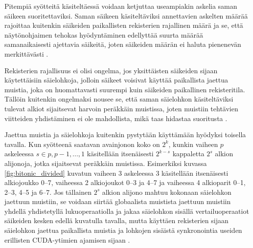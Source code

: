 \documentclass[a4paper,11pt]{article}
\begin{document}
Pitempiä syötteitä käsiteltäessä voidaan ketjuttaa useampiakin askelia saman säikeen suoritettaviksi. Saman säikeen käsiteltäviksi annettavien askelten määrää rajoittaa kuitenkin säikeiden paikallisten rekisterien rajallinen määrä ja se, että näytönohjaimen tehokas hyödyntäminen edellyttää suurta määrää samanaikaisesti ajettavia säikeitä, joten säikeiden määrän ei haluta pienenevän merkittävästi \cite{peters2012gems}.

Rekisterien rajallisuus ei olisi ongelma, jos yksittäisten säikeiden sijaan käytettäisiin säielohkoja, jolloin säikeet voisivat käyttää paikallista jaettua muistia, joka on huomattavasti suurempi kuin säikeiden paikallinen rekisteritila. Tällöin kuitenkin ongelmaksi nousee se, että saman säielohkon käsiteltäviksi tulevat alkiot sijaitsevat harvoin peräkkäin muistissa, joten muistiin tehtävien viitteiden yhdistäminen ei ole mahdollista, mikä taas hidastaa suoritusta \cite{peters2012gems}.

Jaettua muistia ja säielohkoja kuitenkin pystytään käyttämään hyödyksi toisella tavalla. Kun syötteenä saatavan avainjonon koko on $2^k$, kunkin vaiheen $p$ askeleessa $s \in p, p-1, ..., 1$ käsitellään itsenäisesti $2^{k-s}$ kappaletta $2^s$ alkion alijonoja, jotka sijaitsevat peräkkäin muistissa. Esimerkiksi kuvassa \ref{fig:bitonic_divided} kuvatun vaiheen 3 askeleessa 3 käsitellään itsenäisesti alkiojoukko 0--7, vaiheessa 2 alkiojoukot 0--3 ja 4--7 ja vaiheessa 4 alkioparit 0--1, 2--3, 4--5 ja 6--7. Jos tällainen $2^s$ alkion alijono mahtuu kokonaan säielohkon jaettuun muistiin, se voidaan siirtää globaalista muistista jaettuun muistiin yhdellä yhdistetyllä lukuoperaatiolla ja jakaa säielohkon sisällä vertailuoperaatiot säikeiden kesken edellä kuvatulla tavalla, mutta käyttäen rekisterien sijaan säielohkon jaettua paikallista muistia ja lohkojen sisäistä synkronointia useiden erillisten CUDA-ytimien ajamisen sijaan \cite{peters2012gems}.
\end{document}
